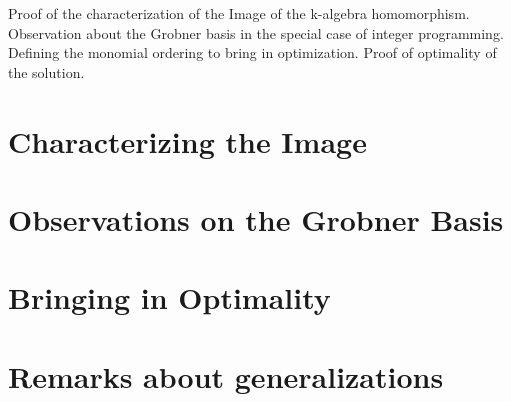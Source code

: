 
\noindent

Proof of the characterization of the Image of the k-algebra homomorphism. Observation about the Grobner basis in the special case of integer programming. Defining the monomial ordering to bring in optimization. Proof of optimality of the solution.

\section{Characterizing the Image}

\section{Observations on the Grobner Basis}

\section{Bringing in Optimality}

\section{Remarks about generalizations}